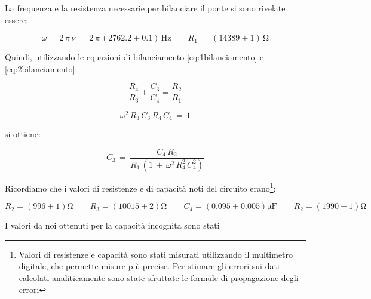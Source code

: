 La frequenza e la resistenza necessarie per bilanciare il ponte si sono rivelate essere:

\begin{equation*}
\omega \, = 2 \, \pi \, \nu \, = \, 2 \, \pi \, (2762.2 \pm 0.1) \, \si{\hertz}
\qquad R_1 \, = \, (14389 \pm 1) \, \si{\ohm}
\end{equation*}




\noindent Quindi, utilizzando le equazioni di bilanciamento \ref{eq:1bilanciamento} e \ref{eq:2bilanciamento}:\\

\noindent
\begin{minipage}{.5\linewidth}

\begin{equation}
\frac{R_4}{R_3} + \frac{C_3}{C_4} = \frac{R_2}{R_1}
\label{eq:1bilanciamento}
\end{equation}

\end{minipage}%
\begin{minipage}{.5\linewidth}

\begin{equation}
\omega^2 \, R_3 \, C_3 \, R_4 \, C_4 \, = \, 1
\label{eq:2bilanciamento}
\end{equation}

\end{minipage}

si ottiene:

\begin{equation}
C_3 \, = \, \frac{C_4 \, R_2}{R_1 \, (1 \, + \, \omega^2 \, R_4^2 \, C_4^2)}
\label{eq:C3}
\end{equation}

\noindent Ricordiamo che i valori di resistenze e di capacità noti del circuito erano\footnote{Valori di resistenze e capacità sono stati misurati utilizzando il multimetro digitale, che permette misure più precise. Per stimare gli errori sui dati calcolati analiticamente sono state sfruttate le formule di propagazione degli errori}:

\begin{equation*}
R_2=(996 \pm 1) \si{\ohm}
\qquad R_3 = (10015 \pm 2)  \si{\ohm}
\qquad C_4=(0.095 \pm 0.005 ) \si{\micro\farad}
\qquad R_2=(1990 \pm 1) \si{\ohm}
\end{equation*}

I valori da noi ottenuti per la capacità incognita sono stati\\

